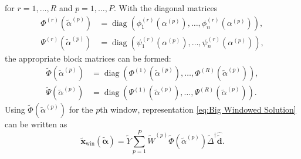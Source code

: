 \documentclass[12pt]{article}
\newcommand{\dVec}{\mathbf{d}}	%
\newcommand{\xVec}{\mathbf{x}}	%
\newcommand{\pinv}[1]{{#1}^\dagger}	%
\DeclareMathOperator{\diag}{diag}	%
\newcommand{\dft}[1]{\widehat{#1}}	%
\newcommand{\regparam}{\alpha}  %
\newcommand{\regparamVec}{\bm{\regparam}}   %
\newcommand{\regparamVecBig}{\widetilde{\regparamVec}}   %
\newcommand{\xBig}{\widetilde{\xVec}}	%
\newcommand{\xWinBig}{\xBig_{\text{win}}}	%
\newcommand{\dBig}{\widetilde{\dVec}}	%
\newcommand{\filt}{\phi}
\newcommand{\mfilt}{\psi}
\begin{document}
for $r = 1,\ldots,R$ and $p = 1,\ldots,P$. With the diagonal matrices
\begin{align*}
    \Phi^{(r)}\left(\widetilde{\regparam}^{(p)}\right) &= \diag\left(\filt_1^{(r)}\left(\regparam^{(p)}\right),\ldots,\filt_n^{(r)}\left(\regparam^{(p)}\right)\right), \\ \Psi^{(r)}\left(\widetilde{\regparam}^{(p)}\right) &= \diag\left(\mfilt_1^{(r)}\left(\regparam^{(p)}\right),\ldots,\mfilt_n^{(r)}\left(\regparam^{(p)}\right)\right),
\end{align*}
the appropriate block matrices can be formed:
\begin{align*}
    \widetilde{\Phi}\left(\widetilde{\regparam}^{(p)}\right) &= \diag\left(\Phi^{(1)}\left(\widetilde{\regparam}^{(p)}\right),\ldots,\Phi^{(R)}\left(\widetilde{\regparam}^{(p)}\right)\right), \\ \widetilde{\Psi}\left(\widetilde{\regparam}^{(p)}\right) &= \diag\left(\Psi^{(1)}\left(\widetilde{\regparam}^{(p)}\right),\ldots,\Psi^{(R)}\left(\widetilde{\regparam}^{(p)}\right)\right).
\end{align*}
Using $\widetilde{\Phi}\left(\widetilde{\regparam}^{(p)}\right)$ for the $p$th window, representation \eqref{eq:Big Windowed Solution} can be written as
\begin{equation}
\label{eq:Big Windowed Solution 2}
    \xWinBig(\regparamVecBig) = \widetilde{Y}\sum_{p=1}^{P} \widetilde{W}^{(p)}\widetilde{\Phi}\left(\widetilde{\regparam}^{(p)}\right)\pinv{\widetilde{\Delta}}\dft{\dBig}.
\end{equation}
\end{document}
